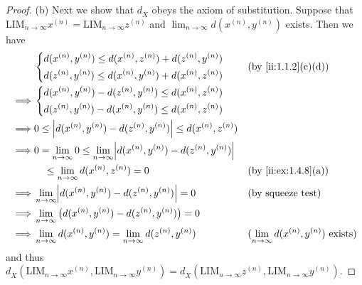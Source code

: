 \begin{proof}{(b)}
  Next we show that \(d_{\overline{X}}\) obeys the axiom of substitution.
  Suppose that \(\text{LIM}_{n \to \infty} x^{(n)} = \text{LIM}_{n \to \infty} z^{(n)}\) and \(\lim_{n \to \infty} d(x^{(n)}, y^{(n)})\) exists.
  Then we have
  \begin{align*}
             & \begin{dcases}
                 d(x^{(n)}, y^{(n)}) \leq d(x^{(n)}, z^{(n)}) + d(z^{(n)}, y^{(n)}) \\
                 d(z^{(n)}, y^{(n)}) \leq d(x^{(n)}, y^{(n)}) + d(x^{(n)}, z^{(n)})
               \end{dcases}                              &  & \by{ii:1.1.2}[c,d]                                                                                                  \\
    \implies & \begin{dcases}
                 d(x^{(n)}, y^{(n)}) - d(z^{(n)}, y^{(n)}) \leq d(x^{(n)}, z^{(n)}) \\
                 d(z^{(n)}, y^{(n)}) - d(x^{(n)}, y^{(n)}) \leq d(x^{(n)}, z^{(n)})
               \end{dcases}                                                                                                  \\
    \implies & 0 \leq \abs{d(x^{(n)}, y^{(n)}) - d(z^{(n)}, y^{(n)})} \leq d(x^{(n)}, z^{(n)})                                                                                     \\
    \implies & 0 = \lim_{n \to \infty} 0 \leq \lim_{n \to \infty} \abs{d(x^{(n)}, y^{(n)}) - d(z^{(n)}, y^{(n)})}                                                                  \\
             & \quad \leq \lim_{n \to \infty} d(x^{(n)}, z^{(n)}) = 0                                             &  & \by{ii:ex:1.4.8}[a]                                            \\
    \implies & \lim_{n \to \infty} \abs{d(x^{(n)}, y^{(n)}) - d(z^{(n)}, y^{(n)})} = 0                            &  & \text{(by squeeze test)}                                    \\
    \implies & \lim_{n \to \infty} \big(d(x^{(n)}, y^{(n)}) - d(z^{(n)}, y^{(n)})\big) = 0                                                                                         \\
    \implies & \lim_{n \to \infty} d(x^{(n)}, y^{(n)}) = \lim_{n \to \infty} d(z^{(n)}, y^{(n)})                  &  & \text{(\(\lim_{n \to \infty} d(x^{(n)}, y^{(n)})\) exists)}
  \end{align*}
  and thus \(d_{\overline{X}}(\text{LIM}_{n \to \infty} x^{(n)}, \text{LIM}_{n \to \infty} y^{(n)}) = d_{\overline{X}}(\text{LIM}_{n \to \infty} z^{(n)}, \text{LIM}_{n \to \infty} y^{(n)})\).


\end{proof}
